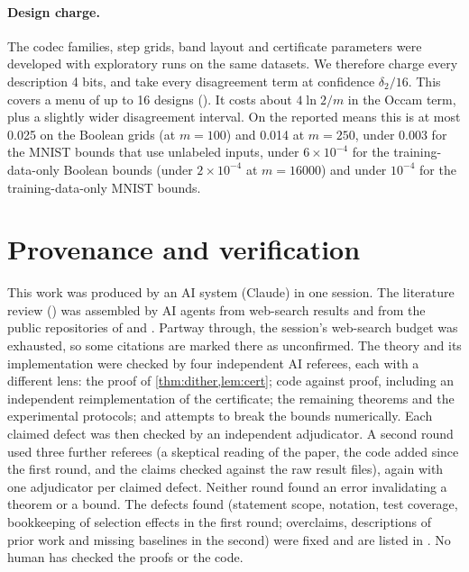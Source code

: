 \paragraph{Design charge.} The codec families, step grids, band layout and certificate parameters were developed with exploratory runs on the same datasets. We therefore charge every description 4 bits, and take every disagreement term at confidence $\delta_2/16$. This covers a menu of up to 16 designs (). It costs about $4\ln2/m$ in the Occam term, plus a slightly wider disagreement interval. On the reported means this is at most 0.025 on the Boolean grids (at $m=100$) and 0.014 at $m=250$, under 0.003 for the MNIST bounds that use unlabeled inputs, under $6\times10^{-4}$ for the training-data-only Boolean bounds (under $2\times10^{-4}$ at $m=16000$) and under $10^{-4}$ for the training-data-only MNIST bounds.

\section{Provenance and verification}\label{app:provenance}

This work was produced by an AI system (Claude) in one session. The literature review () was assembled by AI agents from web-search results and from the public repositories of \citet{bazinet2026bound} and \citet{lotfi2022pac}. Partway through, the session's web-search budget was exhausted, so some citations are marked there as unconfirmed. The theory and its implementation were checked by four independent AI referees, each with a different lens: the proof of \cref{thm:dither,lem:cert}; code against proof, including an independent reimplementation of the certificate; the remaining theorems and the experimental protocols; and attempts to break the bounds numerically. Each claimed defect was then checked by an independent adjudicator. A second round used three further referees (a skeptical reading of the paper, the code added since the first round, and the claims checked against the raw result files), again with one adjudicator per claimed defect. Neither round found an error invalidating a theorem or a bound. The defects found (statement scope, notation, test coverage, bookkeeping of selection effects in the first round; overclaims, descriptions of prior work and missing baselines in the second) were fixed and are listed in . No human has checked the proofs or the code.
